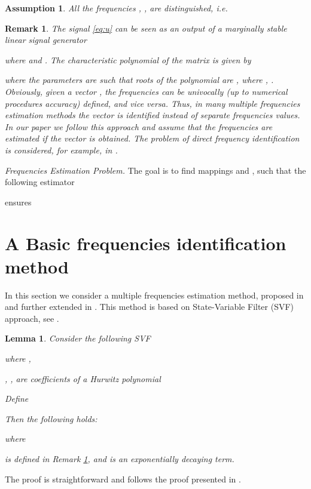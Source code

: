 \documentclass[journal, onecolumn]{IEEEtran}
\newtheorem{assumption}{Assumption}
\newtheorem{remark}{Remark}
\newtheorem{lem}{Lemma}
\begin{document}
\begin{assumption} \label{as:as1}
All the frequencies , , are distinguished, i.e.

\end{assumption}

\begin{remark} \label{rem:theta}
The signal \eqref{eq:u} can be seen as an output of a marginally stable linear signal generator 

where  and . The characteristic polynomial of the matrix  is given by 

where the parameters  are such that roots of the polynomial  are , where , . Obviously, given a vector , the frequencies can be univocally (up to numerical procedures accuracy) defined, and \emph{vice versa}. Thus, in many multiple frequencies estimation methods the vector  is identified instead of separate frequencies values. In our paper we follow this approach and assume that the frequencies are estimated if the vector  is obtained. The problem of \emph{direct} frequency identification is considered, for example, in  \cite{Pin2015Direct}.
\end{remark}

\emph{Frequencies Estimation Problem.} The goal is to find mappings  and , such that the following estimator 

ensures


\section{A Basic frequencies identification method} \label{sec:basic}
In this section we consider a multiple frequencies estimation method, proposed in \cite{aranovskiy2010identification} and further extended in \cite{bobtsov2012switched, pyrkin2015estimation}. This method is based on State-Variable Filter (SVF) approach, see \cite{young1981parameter, Garnier2003SVF}. 

\begin{lem} \label{lem:svf}
Consider the following SVF

where ,

, , are coefficients of a Hurwitz polynomial 

Define

Then the following holds:

where 

 is defined in Remark \ref{rem:theta}, and  is an exponentially decaying term. \end{lem}
The proof is straightforward and follows the proof presented in \cite{pyrkin2015estimation}.
\end{document}

